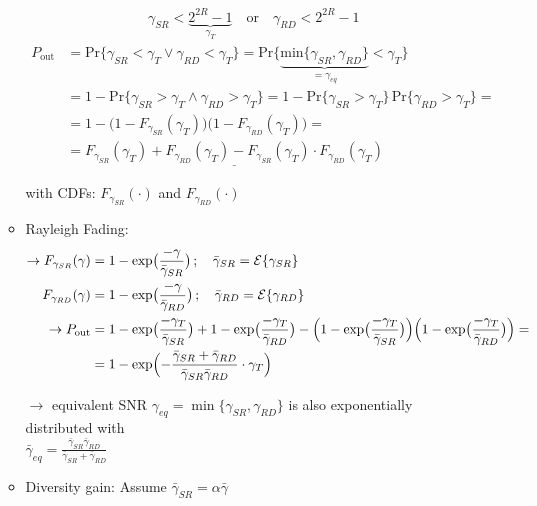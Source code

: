 \documentclass[a4paper, 10pt]{article}
\begin{document}
\begin{itemize}
\begin{itemize}
		\begin{align*}
			\boxed{\gamma_{SR} < \underbrace{2^{2R} - 1}_{\gamma_T} \quad \text{or}\quad \gamma_{RD} < 2^{2R} - 1}
		\end{align*}
		\begin{align*}
			P_{\text{out}} &= \text{Pr}\bigl\{\gamma_{SR} < \gamma_T \vee \gamma_{RD} < \gamma_T\bigr\}
			= \text{Pr}\bigl\{\underbrace{\text{min}\bigl\{\gamma_{SR},\gamma_{RD}\bigr\}}_{ = \gamma_{eq}} < \gamma_T\bigr\} \\ &= 1- \text{Pr}\bigl\{\gamma_{SR} > \gamma_T \wedge \gamma_{RD} > \gamma_T\bigr\} = 1 - \text{Pr}\bigl\{\gamma_{SR} > \gamma_T\bigr\}\,\text{Pr}\bigl\{\gamma_{RD} > \gamma_T\bigr\} = \\ &= 1 - \bigl(1 - F_{\gamma_{SR}}(\gamma_T)\bigr)\bigl(1 - F_{\gamma_{RD}}(\gamma_T)\bigr) = \\ &= \underline{F_{\gamma_{SR}}(\gamma_T) + F_{\gamma_{RD}}(\gamma_T) - F_{\gamma_{SR}}(\gamma_T)\cdot F_{\gamma_{RD}}(\gamma_T)}
		\end{align*}
		\item[] with CDFs: $F_{\gamma_{SR}}(\cdot) $ and $F_{\gamma_{RD}}(\cdot) $ 
		\item Rayleigh Fading: 
		\begin{align*}
		\rightarrow	F_{\gamma_{SR}}(\gamma) &= 1-\exp\bigl(\frac{-\gamma}{\bar{\gamma}_{SR}}\bigr)\,;\quad \bar{\gamma}_{SR} = \mathcal{E}\{\gamma_{SR}\} \\
			F_{\gamma_{RD}}(\gamma) &= 1-\exp\bigl(\frac{-\gamma}{\bar{\gamma}_{RD}}\bigr)\,;\quad \bar{\gamma}_{RD} = \mathcal{E}\{\gamma_{RD}\}\\
		\rightarrow P_{\text{out}} &= 1-\exp\bigl(\frac{-\gamma_T}{\bar{\gamma}_{SR}}\bigr) + 1-\exp\bigl(\frac{-\gamma_T}{\bar{\gamma}_{RD}}\bigr) - \Bigl(1-\exp\bigl(\frac{-\gamma_T}{\bar{\gamma}_{SR}}\bigr)\Bigr)\Bigl( 1-\exp\bigl(\frac{-\gamma_T}{\bar{\gamma}_{RD}}\bigr)\Bigr) = \\
		&= 1 - \exp\Bigl(-\frac{\bar{\gamma}_{SR} + \bar{\gamma}_{RD}}{\bar{\gamma}_{SR}\bar{\gamma}_{RD}}	\cdot\gamma_T\Bigr)
		\end{align*}
		\item[$\rightarrow$] equivalent SNR $\gamma_{eq} = \min\bigl\{\gamma_{SR}, \gamma_{RD}\bigr\} $ is also exponentially distributed with \\ $\bar{\gamma}_{eq} = \frac{\bar{\gamma}_{SR}\bar{\gamma}_{RD}}{\bar{\gamma}_{SR} + \bar{\gamma}_{RD}} $ 
		\item Diversity gain: Assume $\bar{\gamma}_{SR} = \alpha\bar{\gamma} $

\end{itemize}
\end{itemize}
\end{document}

